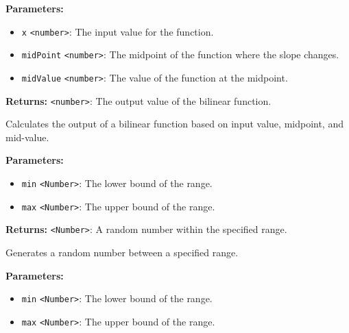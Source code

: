 \documentclass[12pt,a4paper]{article}
\begin{document}
\vspace{5mm}
\noindent {}


\noindent \textbf{Parameters:}
\begin{itemize}
  \item \texttt{x} \texttt{<number>}: The input value for the function.
  \item \texttt{midPoint} \texttt{<number>}: The midpoint of the function where the slope changes.
  \item \texttt{midValue} \texttt{<number>}: The value of the function at the midpoint.
\end{itemize}

\noindent \textbf{Returns:} \texttt{<number>}: The output value of the bilinear function.

\noindent Calculates the output of a bilinear function based on input value, midpoint, and mid-value.

\vspace{5mm}
\noindent {}


\noindent \textbf{Parameters:}
\begin{itemize}
  \item \texttt{min} \texttt{<Number>}: The lower bound of the range.
  \item \texttt{max} \texttt{<Number>}: The upper bound of the range.
\end{itemize}

\noindent \textbf{Returns:} \texttt{<Number>}: A random number within the specified range.

\noindent Generates a random number between a specified range.

\vspace{5mm}
\noindent {}


\noindent \textbf{Parameters:}
\begin{itemize}
  \item \texttt{min} \texttt{<Number>}: The lower bound of the range.
  \item \texttt{max} \texttt{<Number>}: The upper bound of the range.
\end{itemize}
\end{document}
